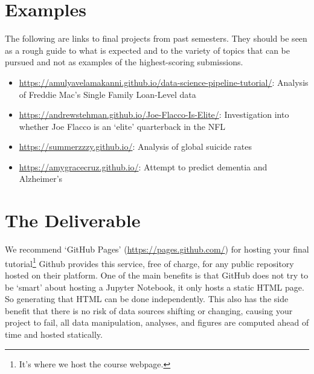 \documentclass{article}
\begin{document}

\section{Examples}

The following are links to final projects from past semesters. They should be
seen as a rough guide to what is expected and to the variety of topics that can
be pursued and not as examples of the highest-scoring submissions.

\begin{itemize}
  \item \url{https://amulyavelamakanni.github.io/data-science-pipeline-tutorial/}: 
        Analysis of Freddie Mac's Single Family Loan-Level data
  \item \url{https://andrewstehman.github.io/Joe-Flacco-Is-Elite/}: 
        Investigation into whether Joe Flacco is an `elite' quarterback in the
        NFL
  \item \url{https://summerzzzy.github.io/}: 
        Analysis of global suicide rates
  \item \url{https://amygracecruz.github.io/}: 
        Attempt to predict dementia and Alzheimer's
\end{itemize}


\section{The Deliverable}

We recommend `GitHub Pages' (\url{https://pages.github.com/}) for hosting your
final tutorial\footnote{It's where we host the course webpage.} Github provides
this service, free of charge, for any public repository hosted on their
platform. One of the main benefits is that GitHub does not try to be `smart'
about hosting a Jupyter Notebook, it only hosts a static HTML page. So
generating that HTML can be done independently. This also has the side benefit
that there is no risk of data sources shifting or changing, causing your
project to fail, all data manipulation, analyses, and figures are computed
ahead of time and hosted statically.
\end{document}
